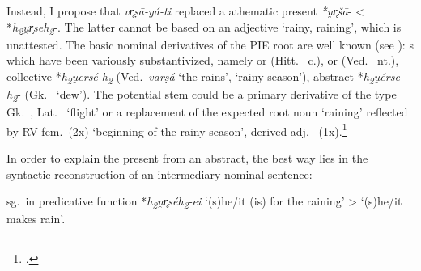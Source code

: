 \documentclass[output=paper,colorlinks,citecolor=brown]{langscibook}
\begin{document}
Instead, I propose that \textit{vr̥ṣā-yá-ti}  replaced a  athematic present \textit{*u̯r̥šā}- < *\textit{h\textsubscript{2}u̯r̥seh\textsubscript{2}}-. The latter cannot be based on an adjective  ‘rainy, raining’, which is unattested. The basic nominal derivatives of the PIE root  are well known (see \citealt[255--256]{Nussbaum2017}): s which have been variously substantivized, namely  or  (Hitt.\  c.),  or  (Ved.\   nt.), collective *\textit{h\textsubscript{2}u̯ersé-h\textsubscript{2}} (Ved.\  \textit{varṣā́} ‘the rains’, ‘rainy season’), abstract  *\textit{h\textsubscript{2}u̯érse-h\textsubscript{2}}- (Gk.\    ‘dew’). The potential stem  could be a primary derivative of the type Gk.\  , Lat.\    ‘flight’ or a replacement of the expected root noun  ‘raining’ reflected by RV  fem.\ (2x) ‘beginning of the rainy season’, derived adj.\  (1x).\footnote{\citealt[525]{Scarlata1999}.} 

In order to explain the  present from an abstract, the best way lies in the syntactic reconstruction of an intermediary nominal sentence: 

\begin{exe}
  \ex  {} sg.\ in predicative function *\textit{h\textsubscript{2}u̯r̥séh\textsubscript{2}-ei} ‘(s)he/it (is) for the raining’ > ‘(s)he/it makes rain’. 
\end{exe}
\end{document}
